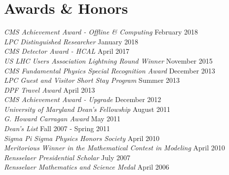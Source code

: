 \section{Awards \& Honors}
{\sl CMS Achievement Award - Offline \& Computing} \hfill February 2018\\
{\sl LPC Distinguished Researcher} \hfill January 2018\\
{\sl CMS Detector Award - HCAL } \hfill April 2017\\
{\sl US LHC Users Association Lightning Round Winner} \hfill November 2015\\
{\sl CMS Fundamental Physics Special Recognition Award} \hfill December 2013\\
\ifdefined\longerflag
{\sl LPC Guest and Visitor Short Stay Program} \hfill Summer 2013\\
{\sl DPF Travel Award} \hfill April 2013\\
\fi
{\sl CMS Achievement Award - Upgrade} \hfill December 2012\\
{\sl University of Maryland Dean's Fellowship} \hfill August 2011\\
{\sl G. Howard Carragan Award} \hfill May 2011\\
\ifdefined\longerflag
{\sl Dean's List} \hfill Fall 2007 - Spring 2011\\
{\sl Sigma Pi Sigma Physics Honors Society} \hfill April 2010\\
\fi
{\sl Meritorious Winner in the Mathematical Contest in Modeling} \hfill April 2010\\
{\sl Rensselaer Presidential Scholar} \hfill July 2007\\
{\sl Rensselaer Mathematics and Science Medal} \hfill April 2006%
